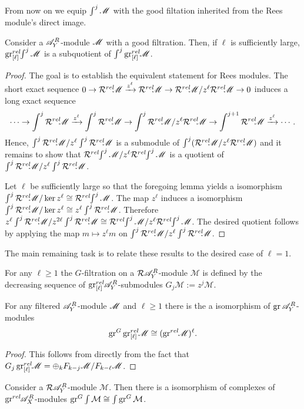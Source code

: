 From now on we equip $\int^j \M$ with the good filtation inherited from the Rees module's direct image.
\begin{lemma}\label{lem: EllLargeSubquotent}
    Consider a $\A_Y^R$-module $\M$ with a good filtration. Then, if $\ell$ is sufficiently large, $\grl \int^j\M$ is a subquotient of $\int^j\grl\M$.
\end{lemma}
\begin{proof}
  The goal is to establish the equivalent statement for Rees modules.
  The short exact sequence $0\to \Rrel\M \xrightarrow{z^\ell}\Rrel \M \to \Rrel\M / z^\ell \Rrel\M \to 0$ induces a long exact sequence
  $$\cdots \to \int^j \Rrel \M \xrightarrow{z^\ell} \int^j \Rrel \M \to \int^j \Rrel\M/z^\ell \Rrel\M \to \int^{j+1} \Rrel \M \xrightarrow{z^\ell}\cdots. $$
  Hence, $\int^j \Rrel \M / z^\ell \int^j \Rrel \M$ is a submodule of $\int^j (\Rrel\M/z^\ell \Rrel\M)$ and it remains to show that $\Rrel \int^j \M/ z^\ell \Rrel \int^j \M$ is a quotient of $\int^j \Rrel \M / z^\ell \int^j \Rrel \M$.

  Let $\ell$ be sufficiently large so that the foregoing lemma yields a isomorphism $\int^j \Rrel \M / \ker z^\ell \cong \Rrel\int^j \M$. The map $z^\ell$ induces a isomorphism $\int^j \Rrel \M / \ker z^\ell \cong z^\ell \int^j \Rrel \M$. Therefore $z^\ell \int^j \Rrel \M / z^{2\ell}\int^j \Rrel\M \cong \Rrel \int^j \M / z^\ell \Rrel\int^j \M $.
  The desired quotient follows by applying the map $m\mapsto z^\ell m$ on $\int^j \Rrel \M / z^\ell \int^j \Rrel \M$.
\end{proof}
The main remaining task is to relate these results to the desired case of $\ell = 1$.
\begin{definition}
  For any $\ell \geq 1$ the $G$-filtration on a $\Rees\A_Y^R$-module $\mathcal{M}$ is defined by the decreasing sequence of $\grl\A_Y^R$-submodules $G_j \mathcal{M} := z^{j}\mathcal{M}$.
\end{definition}
\begin{lemma}\label{lem: GradedGGradedLYieldsGraded}
  For any filtered $\A_Y^R$-module $\M$ and $\ell \geq 1$ there is the a isomorphism of $\gr \A_Y^R$-modules
  $$\gr^G \grl \M \cong (\grrel\M)^\ell.$$
\end{lemma}
\begin{proof}
  This follows from directly from the fact that $G_j\grl\M = \oplus_k F_{k-j}\M /F_{k-\ell}\M$.
\end{proof}
\begin{lemma}\label{lem: grGCommutes}
  Consider a $\Rees\A_Y^R$-module $\mathcal{M}$. Then there is a isomorphism of complexes of $\grrel\A_X^R$-modules $\gr^G\int\mathcal{M} \cong \int\gr^G\mathcal{M}$.
\end{lemma}
